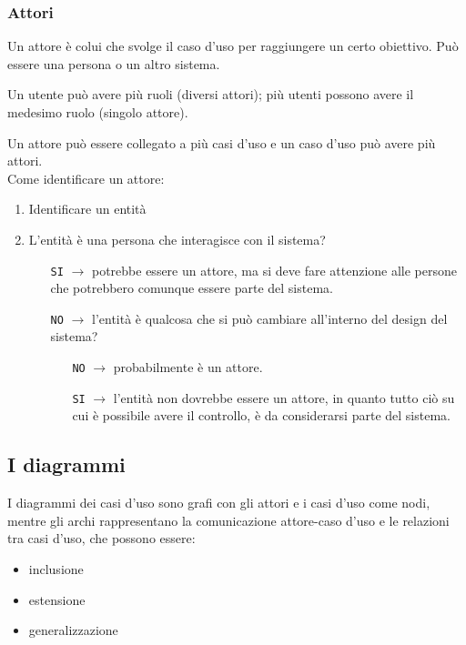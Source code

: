 \subsubsection{Attori}

Un attore è colui che svolge il caso d'uso per raggiungere un certo obiettivo. Può essere una persona o un altro sistema. 

Un utente può avere più ruoli (diversi attori); più utenti possono avere il medesimo ruolo (singolo attore). 

Un attore può essere collegato a più casi d'uso e un caso d'uso può avere più attori. \\
Come identificare un attore:
\begin{enumerate}
\item Identificare un entità
\item L'entità è una persona che interagisce con il sistema?
\begin{itemize}
\item[\texttt{SI}] $\to$ potrebbe essere un attore, ma si deve fare attenzione alle persone che potrebbero comunque essere parte del sistema.
\item[\texttt{NO}] $\to$ l'entità è qualcosa che si può cambiare all'interno del design del sistema?
\begin{itemize}
\item[\texttt{NO}] $\to$ probabilmente è un attore.
\item[\texttt{SI}] $\to$ l'entità non dovrebbe essere un attore, in quanto tutto ciò su cui è possibile avere il controllo, è da considerarsi parte del sistema.
\end{itemize}
\end{itemize}
\end{enumerate}

\subsection{I diagrammi}

I diagrammi dei casi d'uso sono grafi con gli attori e i casi d'uso come nodi, mentre gli archi rappresentano la comunicazione attore-caso d'uso e le relazioni tra casi d'uso, che possono essere:
\begin{itemize}
\item inclusione
\item estensione
\item generalizzazione
\end{itemize}

